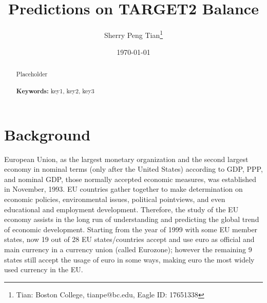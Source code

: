 \documentclass[12pt]{article}
\begin{document}
\begin{titlepage}
\title{Predictions on TARGET2 Balance}
\author{Sherry Peng Tian\thanks{Tian: Boston College, tianpe@bc.edu, Eagle ID: 17651338}}
\date{\today}
\maketitle
\begin{abstract}
\noindent Placeholder\\
\vspace{0in}\\
\noindent\textbf{Keywords:} key1, key2, key3\\
\bigskip
\end{abstract}
\setcounter{page}{0}
\thispagestyle{empty}
\end{titlepage}

\pagebreak \newpage

\doublespacing




\section{Background} \label{sec:background}

European Union, as the largest monetary organization and the second largest economy in nominal terms (only after the United States) according to GDP, PPP, and nominal GDP, those normally accepted economic measures, was established in November, 1993. EU countries gather together to make determination on economic policies, environmental issues, political pointviews, and even educational and employment development. Therefore, the study of the EU economy assists in the long run of understanding and predicting the global trend of economic development. Starting from the year of 1999 with some EU member states, now 19 out of 28 EU states/countries accept and use euro as official and main currency in a currency union (called Eurozone); however the remaining 9 states still accept the usage of euro in some ways, making euro the most widely used currency in the EU. 
\end{document}
